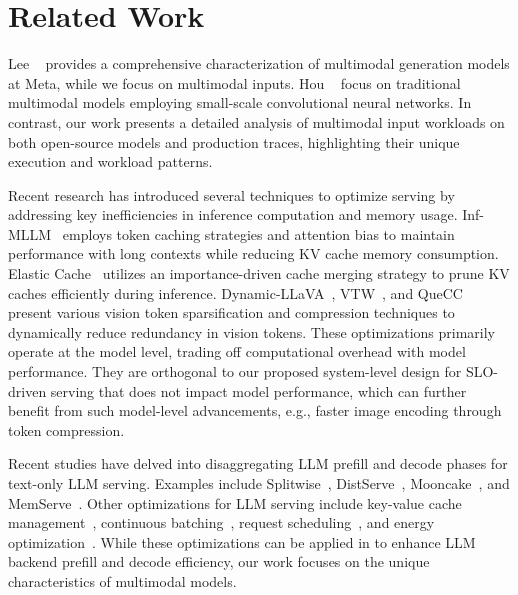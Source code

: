 \section{Related Work}
Lee \etal{}~\cite{lee2024characterizing} provides a comprehensive characterization of multimodal generation models at Meta, while we focus on multimodal inputs.
Hou \etal{}~\cite{hou2022characterizing} focus on traditional multimodal models employing small-scale convolutional neural networks.
In contrast, our work presents a detailed analysis of multimodal input workloads on both open-source \lmm models and production traces, highlighting their unique execution and workload patterns.

Recent research has introduced several techniques to optimize \lmm serving by addressing key inefficiencies in inference computation and memory usage.
Inf-MLLM~\cite{ning2024infmllm} employs token caching strategies and attention bias to maintain performance with long contexts while reducing KV cache memory consumption.
Elastic Cache~\cite{liu2025efficient} utilizes an importance-driven cache merging strategy to prune KV caches efficiently during inference.
Dynamic-LLaVA~\cite{huang2024dynamic}, VTW~\cite{lin2024boosting}, and QueCC~\cite{li2024inference} present various vision token sparsification and compression techniques to dynamically reduce redundancy in vision tokens.
These optimizations primarily operate at the model level, trading off computational overhead with model performance.
They are orthogonal to our proposed system-level design for SLO-driven \lmm serving that does not impact model performance, which can further benefit from such model-level advancements, e.g., faster image encoding through token compression.

Recent studies have delved into disaggregating LLM prefill and decode phases for text-only LLM serving.
Examples include Splitwise~\cite{patel2024splitwise}, DistServe~\cite{zhong2024distserve}, Mooncake~\cite{qin2024mooncake}, and MemServe~\cite{hu2024memserve}.
Other optimizations for LLM serving include key-value cache management~\cite{vllm}, continuous batching~\cite{orca}, request scheduling~\cite{aiops2024qiu,patke2024queue,sun2024llumnix,sarathi-serve}, and energy optimization~\cite{stojkovic2025tapas,stojkovic2024dynamollm,qiu2024muserve}.
While these optimizations can be applied in \sysname{} to enhance LLM backend prefill and decode efficiency, our work focuses on the unique characteristics of multimodal models.